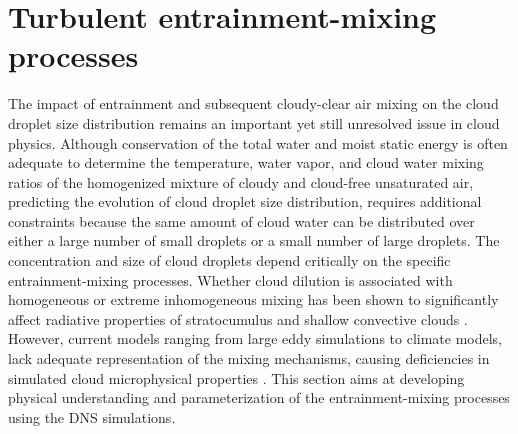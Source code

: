 \documentclass[draft,linenumbers]{agujournal}
\begin{document}
\section{Turbulent entrainment-mixing processes}\label{mixing_processes}

The impact of entrainment and subsequent cloudy-clear air mixing on the cloud droplet size distribution remains an important yet still unresolved issue in cloud physics. Although conservation of the total water and moist static energy is often adequate to determine the temperature, water vapor, and cloud water mixing ratios of the homogenized mixture of cloudy and cloud-free unsaturated air,  predicting the evolution of cloud droplet size distribution, requires additional constraints because {the same amount of} cloud water can be distributed over either a large number of small droplets or a small number of large droplets. The concentration and size of cloud droplets depend critically on the specific entrainment-mixing processes. Whether cloud dilution is associated with homogeneous or extreme inhomogeneous mixing has been shown to significantly affect radiative properties of stratocumulus \citep{Chosson2007} and shallow convective clouds \citep{Grabowski2006, Slawinska2008}. However, current models ranging from large eddy simulations to climate models, lack adequate representation of the mixing mechanisms, causing deficiencies in simulated cloud microphysical properties \citep{Endo2015}. This section aims at developing physical understanding and parameterization of the entrainment-mixing processes using the DNS simulations. 
\end{document}
